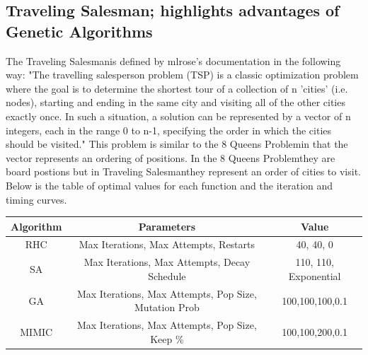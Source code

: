 \documentclass[11pt]{article}
\newcommand{\problemtwo}{8 Queens Problem}
\newcommand{\problemthree}{Traveling Salesman}
\begin{document}
    \subsection{\problemthree \hspace{0em}; highlights advantages of Genetic Algorithms}
    The \problemthree is defined by mlrose's documentation in the following way:
    "The travelling salesperson problem (TSP) is a classic optimization problem where the goal is to determine the shortest tour of a collection of n 'cities' (i.e. nodes), starting and ending in the same city and visiting all of the other cities exactly once.
    In such a situation, a solution can be represented by a vector of n integers, each in the range 0 to n-1, specifying the order in which the cities should be visited."\cite{Hayes19}
    This problem is similar to the \problemtwo in that the vector represents an ordering of positions.
    In the \problemtwo they are board postions but in \problemthree they represent an order of cities to visit.
    Below is the table of optimal values for each function and the iteration and timing curves.
    \begin{center}
        \begin{tabular}{| c | c | c |}
            \hline
            Algorithm & Parameters                                            & Value                 \\
            \hline
            \hline
            RHC       & Max Iterations, Max Attempts, Restarts                & 40, 40, 0             \\
            \hline
            SA        & Max Iterations, Max Attempts, Decay Schedule          & 110, 110, Exponential \\
            \hline
            GA        & Max Iterations, Max Attempts, Pop Size, Mutation Prob & 100,100,100,0.1       \\
            \hline
            MIMIC     & Max Iterations, Max Attempts, Pop Size, Keep \%       & 100,100,200,0.1       \\
            \hline
        \end{tabular}
    \end{center}
\end{document}
